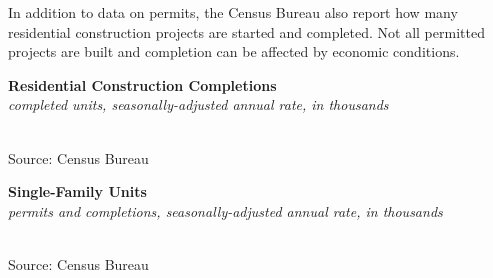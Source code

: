 \documentclass{report}
\makeatletter
\newcommand{\tbllink}[1]{\href{https://raw.githubusercontent.com/bdecon/US-chartbook/master/chartbook/data/#1}{\faTable}}
\newcommand*\short[1]{\expandafter\@gobbletwo\number\numexpr#1\relax}
\newcommand{\dateaxisticks}{
		date coordinates in=x, axis line style={draw=none},
		xmax={2023-02-15},
		max space between ticks=40,	    
		xtick={{1990-01-01}, {1992-01-01}, {1994-01-01}, 
			{1996-01-01}, {1998-01-01}, {2000-01-01}, 
			{2002-01-01}, {2004-01-01}, {2006-01-01},
			{2008-01-01}, {2010-01-01}, {2012-01-01}, {2014-01-01},
		    {2016-01-01}, {2018-01-01}, {2020-01-01}, {2022-01-01}, 
		    {2024-01-01}, {2026-01-01}},
		minor xtick={{1989-01-01}, {1991-01-01}, {1993-01-01},
			{1995-01-01}, {1997-01-01}, {1999-01-01}, 
			{2001-01-01}, {2003-01-01}, {2005-01-01}, {2007-01-01},
		    {2009-01-01}, {2011-01-01}, {2013-01-01}, {2015-01-01},
		    {2017-01-01}, {2019-01-01}, {2021-01-01}, {2023-01-01}, 
		    {2025-01-01}, {2027-01-01}},
		enlarge y limits={0.06}, enlarge x limits={0.01},
		}
\newcommand{\bbar}[2]{extra #1 ticks = {{#2}}, extra #1 tick labels = ,
		extra #1 tick style = {grid=major, grid style={thick, black!25}},}
\newcommand{\stdline}[4]{\addplot[very thick, no markers, color=#1] 
		table [x=#2, y=#3, col sep=comma] {#4};	}
\newcommand{\thinline}[4]{\addplot[no markers, color=#1] 
		table [x=#2, y=#3, col sep=comma] {#4};	}
\newcommand{\rbars}{
		\fill[color=black!10] (axis cs:{1990-07-01},\pgfkeysvalueof{/pgfplots/ymin}) rectangle 
			(axis cs:{1991-03-01}, \pgfkeysvalueof{/pgfplots/ymax});
		\fill[color=black!10] (axis cs:{2007-12-01},\pgfkeysvalueof{/pgfplots/ymin}) rectangle 
			(axis cs:{2009-07-01}, \pgfkeysvalueof{/pgfplots/ymax});
		\fill[color=black!10] (axis cs:{2001-03-01},\pgfkeysvalueof{/pgfplots/ymin}) rectangle 
			(axis cs:{2001-11-01}, \pgfkeysvalueof{/pgfplots/ymax});
		\fill[color=black!10] (axis cs:{2020-02-01},\pgfkeysvalueof{/pgfplots/ymin}) rectangle 
			(axis cs:{2020-05-01}, \pgfkeysvalueof{/pgfplots/ymax});}
\makeatother
\begin{document}
{\begin{minipage}{0.76\textwidth}
\small In addition to data on permits, the Census Bureau also report how many residential construction projects are started and completed. Not all permitted projects are built and completion can be affected by economic conditions. 
\vspace{1mm}

\normalsize{\textbf{Residential Construction Completions}}\\
\footnotesize{\textit{completed units, seasonally-adjusted annual rate, in thousands}}\\
\hspace*{-2mm} \\
\footnotesize{Source: Census Bureau} \hfill \tbllink{permits_total.csv}
\vspace{2mm}

\small 
\vspace{1mm}

\normalsize \textbf{Single-Family Units}\\
\footnotesize{\textit{permits and completions, seasonally-adjusted annual rate, in thousands}}\\
\hspace*{-2mm} \\
\footnotesize{Source: Census Bureau} \hfill \tbllink{permits_single.csv}
\end{minipage}
\newpage
\begin{minipage}{0.76\textwidth}
\small 
\vspace{1mm}


\end{minipage}}
\end{document}
